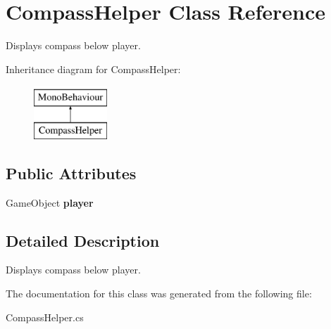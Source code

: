 \hypertarget{class_compass_helper}{}\section{Compass\+Helper Class Reference}
\label{class_compass_helper}


Displays compass below player.  


Inheritance diagram for Compass\+Helper\+:\begin{figure}[H]
\begin{center}
\leavevmode
\includegraphics[height=2.000000cm]{class_compass_helper}
\end{center}
\end{figure}
\subsection*{Public Attributes}
\begin{DoxyCompactItemize}
\item 
\mbox{\label{class_compass_helper_af5db9bcc613ae5e5086781336b9f8d75}} 
Game\+Object {\bfseries player}
\end{DoxyCompactItemize}


\subsection{Detailed Description}
Displays compass below player. 



The documentation for this class was generated from the following file\+:\begin{DoxyCompactItemize}
\item 
Compass\+Helper.\+cs\end{DoxyCompactItemize}
